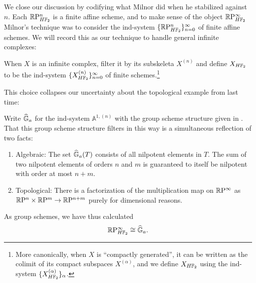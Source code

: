 We close our discussion by codifying what Milnor did when he stabilized against $n$.  Each $\mathbb R\mathrm P^n_{H\mathbb F_2}$ is a finite affine scheme, and to make sense of the object $\mathbb R\mathrm P^\infty_{H\mathbb F_2}$ Milnor's technique was to consider the ind-system $\{\mathbb R\mathrm P^n_{H\mathbb F_2}\}_{n=0}^\infty$ of finite affine schemes.  We will record this as our technique to handle general infinite complexes:
\begin{definition}
When $X$ is an infinite complex, filter it by its subskeleta $X^{(n)}$ and define $X_{H\mathbb F_2}$ to be the ind-system $\{X^{(n)}_{H\mathbb F_2}\}_{n=0}^\infty$ of finite schemes.\footnote{More canonically, when $X$ is ``compactly generated'', it can be written as the colimit of its compact subspaces $X^{(\alpha)}$, and we define $X_{H\mathbb F_2}$ using the ind-system $\{X^{(\alpha)}_{H\mathbb F_2}\}_\alpha$.}
\end{definition}

This choice collapses our uncertainty about the topological example from last time:
\begin{example}\label{RPinftyExampleForReal}
Write $\widehat{\mathbb G}_a$ for the ind-system $\mathbb A^{1, (n)}$ with the group scheme structure given in .  That this group scheme structure filters in this way is a simultaneous reflection of two facts:
\begin{enumerate}
\item Algebraic: The set $\widehat{\mathbb G}_a(T)$ consists of all nilpotent elements in $T$.  The sum of two nilpotent elements of orders $n$ and $m$ is guaranteed to itself be nilpotent with order at most $n+m$.
\item Topological: There is a factorization of the multiplication map on $\mathbb R\mathrm P^\infty$ as $\mathbb R\mathrm P^n \times \mathbb R\mathrm P^m \to \mathbb R\mathrm P^{n+m}$ purely for dimensional reasons.
\end{enumerate}
As group schemes, we have thus calculated \[\mathbb R\mathrm P^\infty_{H\mathbb F_2} \cong \widehat{\mathbb G}_a.\]
\end{example}

